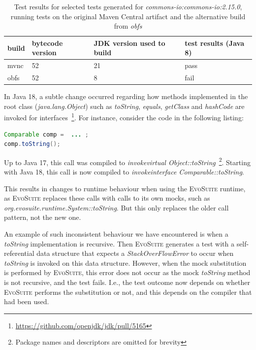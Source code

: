 \documentclass[conference]{IEEEtran}
\makeatletter
\newcommand{\evosuite}{\textsc{EvoSuite}\@\xspace}
\makeatother
\begin{document}
\begin{table}[h]
	\centering
	\begin{tabular}{|p{2.0cm}p{1.2cm}p{1.5cm}p{1.3cm}|}
		\hline
		build         & bytecode version & JDK version used to build & test results (Java 8)                                            \\ \hline 
		mvnc & 52       & 21                        & pass                                                                                        \\
		obfs         & 52               & 8                        & fail              \\ \hline
	\end{tabular}
	\caption{Test results for selected tests generated for  \textit{commons-io:commons-io:2.15.0}, running tests on the original Maven Central artifact and the alternative build from \textit{obfs}}
	\label{tab:stackoverflow}
\end{table}

In Java 18, a subtle change occurred regarding how methods implemented in the root class (\textit{java.lang.Object}) such as \textit{toString}, \textit{equals}, \textit{getClass} and \textit{hashCode} are invoked for interfaces~\footnote{\url{https://github.com/openjdk/jdk/pull/5165}}.
For instance, consider the code in the following listing:

\begin{lstlisting}[language=Java]
Comparable comp =  ... ; 
comp.toString();
\end{lstlisting}	

Up to Java 17, this call was compiled to \textit{invokevirtual Object::toString}~\footnote{Package names and descriptors are omitted for brevity}. Starting with Java 18, this call is now compiled to \textit{invokeinterface Comparable::toString}.

This results in changes to runtime behaviour when using the \evosuite runtime, as \evosuite replaces these calls with calls to its own mocks, such as  \textit{org.evosuite.runtime.System::toString}. But this only replaces the older call pattern, not the new one. 

An example of such inconsistent behaviour we have encountered  is when a \textit{toString} implementation is recursive. Then \evosuite generates a test with a self-referential data structure that expects a \textit{StackOverFlowError} to occur when \textit{toString} is invoked on this data structure. However, when the mock substitution is performed by \evosuite, this error does not occur as the mock \textit{toString} method is not recursive, and the test fails. I.e., the test outcome now depends on whether \evosuite performs the substitution or not, and this depends on the compiler that had been used.
\end{document}
